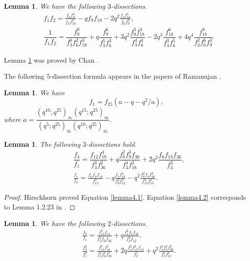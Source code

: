 \documentclass[12pt]{amsart}
\theoremstyle{plain}
\newtheorem{lemma}[theorem]{Lemma}
\theoremstyle{definition}
\begin{document}
\begin{lemma} \label{lemma2}  We have the following $3$-dissections.
 \begin{align}
    &f_{1}f_{2}= \frac{f_{6} f_{9}^{4}}{ f_{3} f_{18}^{2}}-qf_{9}f_{18} -2q^{2} \frac{f_{3} f_{18}^{4}}{f_{6} f_{9}^{2}}, \label{lemma2.1}\\
    &\dfrac{1}{f_{1}f_{2}}=\dfrac{f_{9}^{9}}{f_{3}^{6}f_{6}^{2}f_{18}^{3}}+q\dfrac{f_{9}^{6}}{f_{3}^{5}f_{6}^{3}}+3q^{2}\dfrac{f_{9}^{3}f_{18}^{3}}{f_{3}^{4}f_{6}^{4}}-2q^{3}\dfrac{f_{18}^{6}}{f_{3}^{3}f_{6}^{5}}+4q^{4}\dfrac{f_{18}^{9}}{f_{3}^{2}f_{6}^{6}f_{9}^{3}}. \label{lemma2.2}
    \end{align}
\end{lemma}
\noindent Lemma \ref{lemma2} was proved by Chan \cite{Chan2010}.

The following $5$-dissection formula appears in the papers of Ramanujan  \cite[p. 212]{RAM}. 
\begin{lemma} \label{lemma3} We have
    \begin{equation}
        f_{1}=f_{25}(a-q-q^{2}/a), \label{lemma3.1}
    \end{equation}
    where
$a=\dfrac{(q^{10};q^{25})_\infty(q^{15};q^{25})_\infty}{(q^{5};q^{25})_\infty(q^{10};q^{25})_\infty}$. 
\end{lemma}

\begin{lemma} \label{lemma4} The following $3$-dissections hold.
\begin{align}
&\dfrac{f_{4}}{f_{1}}=\dfrac{f_{12}f_{18}^{4}}{f_{3}^{3}f_{36}^{2}}+ q\dfrac{f_{6}^{2}f_{9}^{3}f_{36}}{f_{3}^{4}f_{18}^{2}}+2q^{2}\dfrac{f_{6}f_{18}f_{36}}{f_{3}^{3}}, \label{lemma4.1}\\
&\frac{f_{1}}{f_{4}}= \frac{f_{6} f_{9} f_{18}}{f_{12}^{3}}-q\frac{f_{3} f_{18}^{4}}{f_{9}^{2} f_{12}^{3}}-q^{2} \frac{f_{6}^{2} f_{9} f_{36}^{3}}{f_{12}^{4} f_{18}^{2}}. \label{lemma4.2}
\end{align}
\end{lemma}

\begin{proof}
Hirschhorn \cite[(33.2.6)]{Hirschhorn2017}  proved Equation \eqref{lemma4.1}. Equation \eqref{lemma4.2} corresponds to Lemma  1.2.23 in \cite{Nayaka2018}.
\end{proof}


\begin{lemma} \label{lemma5} We have the following $2$-dissections.
\begin{align}
    &\frac{f_{9}}{f_{1}}=\frac{f_{12}^{3}f_{18}}{f_{2}^{2} f_{6} f_{36}} +q \frac{f_{4}^{2} f_{6} f_{36}}{f_{2}^{3} f_{12}}, \label{lemma5.1}\\
    &\frac{f_{9}^{2}}{f_{1}^{2}}=\frac{f_{12}^{6}f_{18}^{2}}{f_{2}^{4} f_{6}^{2} f_{36}^{2}} +2q \frac{f_{4}^{2} f_{12}^{2} f_{18}}{f_{2}^{5}}
+q^{2} \frac{f_{4}^{4} f_{6}^{2} f_{36}^{2}}{f_{2}^{6} f_{12}^{2}}. \label{lemma5.2} 
\end{align}
\end{lemma}
\end{document}
